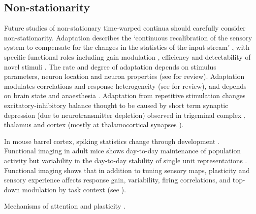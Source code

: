 \documentclass{article}
\begin{document}
\subsection*{Non-stationarity}

Future studies of non-stationary time-warped continua should carefully consider non-stationarity. Adaptation describes the `continuous recalibration of the sensory system to compensate for the changes in the statistics of the input stream' \cite{kheradpezhouh2017response}, with specific functional roles including gain modulation \cite{ahissar2000transformation, heiss2008shift, khatri2009stimulus, mohar2013opposite}, efficiency \cite{sharpee2006adaptive} and detectability of novel stimuli \cite{dragoi2002dynamics, ulanovsky2003processing}. The rate and degree of adaptation depends on stimulus parameters, neuron location and neuron properties (see \cite{kheradpezhouh2017response} for review). Adaptation modulates correlations and response heterogeneity (see \cite{kheradpezhouh2017response} for review), and depends on brain state and anaesthesia \cite{castro2004absence, katz2012trial}. Adaptation from repetitive stimulation changes excitatory-inhibitory balance \cite{higley2006balanced, heiss2008shift, malina2013imbalance} thought to be caused by short term synaptic depression (due to neurotransmitter depletion) observed in trigeminal complex \cite{mohar2013opposite}, thalamus \cite{deschenes2003relay} and cortex \cite{higley2006balanced, heiss2008shift, malina2013imbalance} (mostly at thalamocortical synapses \cite{chung2002short}).

In mouse barrel cortex, spiking statistics change through development \cite{van2017layer}. Functional imaging in adult mice shows day-to-day maintenance of population activity \cite{margolis2012reorganization, mayrhofer2015sparse} but variability in the day-to-day stability of single unit representations \cite{mayrhofer2015sparse}. Functional imaging shows that in addition to tuning sensory maps, plasticity and sensory experience affects response gain, variability, firing correlations, and top-down modulation by task context (see \cite{lemessurier2018plasticity}). 

Mechanisms of attention \cite{cohen2010neuronal} and plasticity \cite{lemessurier2018plasticity}.






\end{document}
